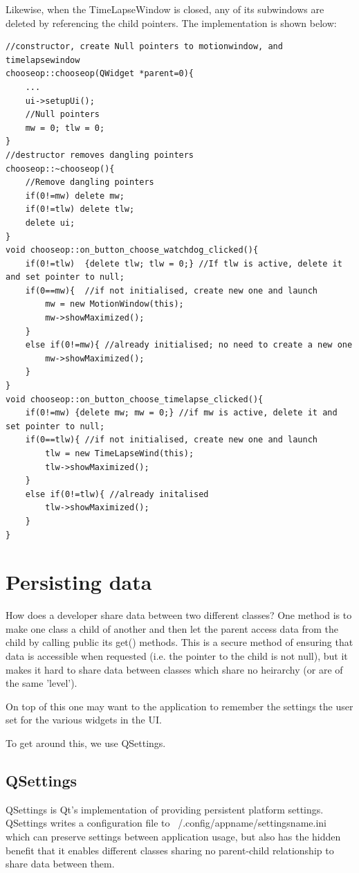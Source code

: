 \documentclass[11pt]{article} %
\begin{document}
Likewise, when the TimeLapseWindow is closed, any of its subwindows are deleted by referencing the child pointers.
The implementation is shown below:\\
\begin{lstlisting}[title=Snippet from ChooseOp.cpp (MainWindow)]
//constructor, create Null pointers to motionwindow, and timelapsewindow
chooseop::chooseop(QWidget *parent=0){
    ...
    ui->setupUi();
    //Null pointers
    mw = 0; tlw = 0;
}
//destructor removes dangling pointers
chooseop::~chooseop(){
    //Remove dangling pointers
    if(0!=mw) delete mw;
    if(0!=tlw) delete tlw;
    delete ui;
}
void chooseop::on_button_choose_watchdog_clicked(){
    if(0!=tlw)  {delete tlw; tlw = 0;} //If tlw is active, delete it and set pointer to null;
    if(0==mw){  //if not initialised, create new one and launch
        mw = new MotionWindow(this); 
        mw->showMaximized();
    }
    else if(0!=mw){ //already initialised; no need to create a new one
        mw->showMaximized();
    }
}
void chooseop::on_button_choose_timelapse_clicked(){
    if(0!=mw) {delete mw; mw = 0;} //if mw is active, delete it and set pointer to null;
    if(0==tlw){ //if not initialised, create new one and launch
        tlw = new TimeLapseWind(this);
        tlw->showMaximized();
    }
    else if(0!=tlw){ //already initalised
        tlw->showMaximized();
    }
}
\end{lstlisting}

\section{Persisting data}
How does a developer share data between two different classes? One method is to make one class a child of another and then let the parent access data from the child by calling public its get() methods. This is a secure method of ensuring that data is accessible when requested (i.e. the pointer to the child is not null), but it makes it hard to share data between classes which share no heirarchy (or are of the same 'level').

On top of this one may want to the application to remember the settings the user set for the various widgets in the UI.

To get around this, we use QSettings.

\subsection{QSettings}
QSettings is Qt's implementation of providing persistent platform settings. QSettings writes a configuration file to ~/.config/appname/settingsname.ini which can preserve settings between application usage, but also has the hidden benefit that it enables different classes sharing no parent-child relationship to share data between them.
\end{document}
